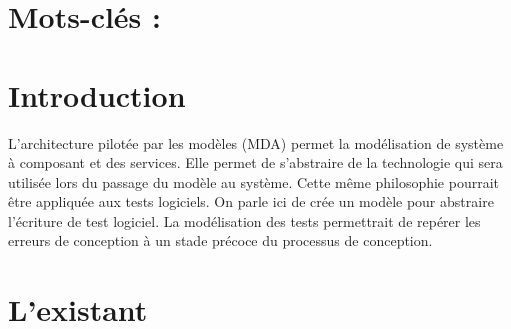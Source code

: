 \documentclass[
10pt, %
a4paper, %
oneside, %
headinclude,footinclude, %
BCOR5mm, %
]{scrartcl}
\begin{document}
\lipsum[1] %


\section*{Mots-clés : }





\newpage %


\section{Introduction}

L’architecture pilotée par les modèles (MDA) permet la modélisation de système à composant et des services. Elle permet de s’abstraire de la technologie qui sera utilisée lors du passage du modèle au système. Cette même philosophie pourrait être appliquée aux tests logiciels. On parle ici de crée un modèle pour abstraire l’écriture de test logiciel. La modélisation des tests permettrait de repérer les erreurs de conception à un stade précoce du processus de conception.
 

\newpage 
\section{L'existant}
\end{document}
